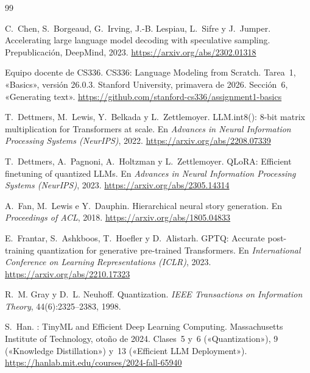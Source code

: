 \begin{thebibliography}{99}
\small

C.~Chen, S.~Borgeaud, G.~Irving, J.-B. Lespiau, L.~Sifre y J.~Jumper.
\newblock Accelerating large language model decoding with speculative sampling.
\newblock Prepublicación, DeepMind, 2023.
\newblock \url{https://arxiv.org/abs/2302.01318}

Equipo docente de CS336.
\newblock CS336: Language Modeling from Scratch. Tarea~1, «Basics», versión 26.0.3.
\newblock Stanford University, primavera de 2026. Sección~6, «Generating text».
\newblock \url{https://github.com/stanford-cs336/assignment1-basics}

T.~Dettmers, M.~Lewis, Y.~Belkada y L.~Zettlemoyer.
\newblock LLM.int8(): 8-bit matrix multiplication for Transformers at scale.
\newblock En \emph{Advances in Neural Information Processing Systems (NeurIPS)}, 2022.
\newblock \url{https://arxiv.org/abs/2208.07339}

T.~Dettmers, A.~Pagnoni, A.~Holtzman y L.~Zettlemoyer.
\newblock QLoRA: Efficient finetuning of quantized LLMs.
\newblock En \emph{Advances in Neural Information Processing Systems (NeurIPS)}, 2023.
\newblock \url{https://arxiv.org/abs/2305.14314}

A.~Fan, M.~Lewis e Y.~Dauphin.
\newblock Hierarchical neural story generation.
\newblock En \emph{Proceedings of ACL}, 2018.
\newblock \url{https://arxiv.org/abs/1805.04833}

E.~Frantar, S.~Ashkboos, T.~Hoefler y D.~Alistarh.
\newblock GPTQ: Accurate post-training quantization for generative pre-trained Transformers.
\newblock En \emph{International Conference on Learning Representations (ICLR)}, 2023.
\newblock \url{https://arxiv.org/abs/2210.17323}

R.~M. Gray y D.~L. Neuhoff.
\newblock Quantization.
\newblock \emph{IEEE Transactions on Information Theory}, 44(6):2325--2383, 1998.

S.~Han.
: TinyML and Efficient Deep Learning Computing.
\newblock Massachusetts Institute of Technology, otoño de 2024. Clases~5 y~6 («Quantization»), 9 («Knowledge Distillation») y~13 («Efficient LLM Deployment»).
\newblock \url{https://hanlab.mit.edu/courses/2024-fall-65940}


\end{thebibliography}
